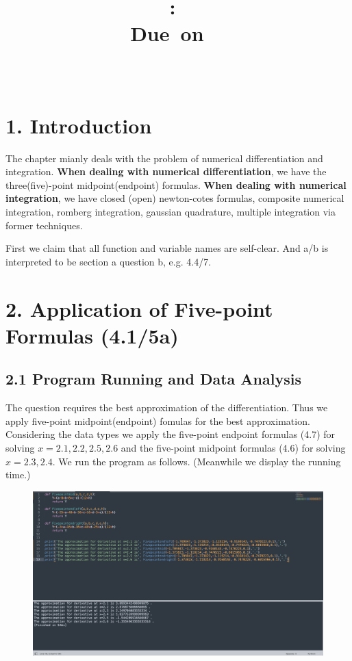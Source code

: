 \documentclass{article}
\title{
    \vspace{2in}
    \textmd{\textbf{\hmwkClass:\ \hmwkTitle}}\\
    \normalsize\vspace{0.1in}\small{Due\ on\ \hmwkDueDate\ }\\
    \vspace{0.1in}\large{\textit{\hmwkClassInstructor\ \hmwkClassTime}}
    \vspace{3in}
}
\author{\hmwkAuthorName}
\date{}
\begin{document}
\maketitle

\pagebreak
\section{1. Introduction}

The chapter mianly deals with the problem of numerical differentiation and integration. \textbf{When dealing with numerical differentiation}, we have the three(five)-point midpoint(endpoint) formulas. \textbf{When dealing with numerical integration}, we have closed (open) newton-cotes formulas, composite numerical integration, romberg integration, gaussian quadrature, multiple integration via former techniques.

First we claim that all function and variable names are self-clear. And a/b is interpreted to be section a question b, e.g. 4.4/7.

\section{2. Application of Five-point Formulas (4.1/5a)}

\subsection{2.1 Program Running and Data Analysis}
    
    The question requires the best approximation of the differentiation. Thus we apply five-point midpoint(endpoint) fomulas for the best approximation. Considering the data types we apply the five-point endpoint formulas (4.7) for solving $x=2.1,2.2,2.5,2.6$ and the five-point midpoint formulas (4.6) for solving $x=2.3,2.4$. We run the program as follows. (Meanwhile we display the running time.)
    \begin{figure}[h]
    \centering
    \includegraphics[scale=0.28]{Program1}
    \end{figure}
\end{document}
